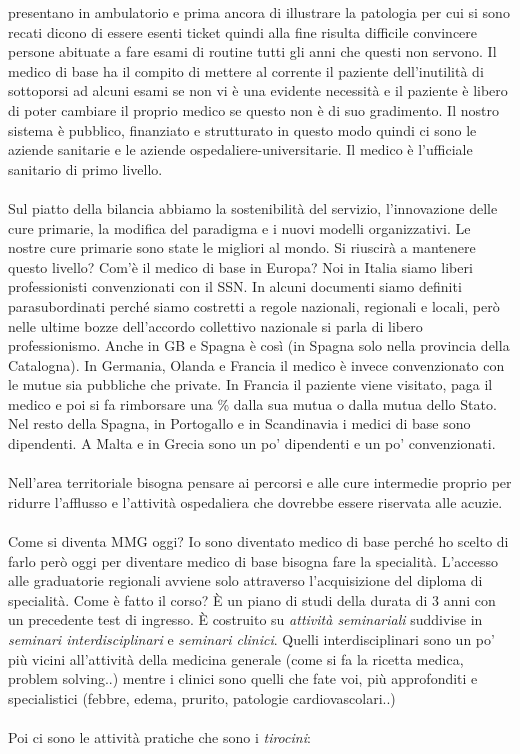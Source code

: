 presentano in ambulatorio e prima ancora di illustrare la patologia per
cui si sono recati dicono di essere esenti ticket quindi alla fine
risulta difficile convincere persone abituate a fare esami di routine
tutti gli anni che questi non servono. Il medico di base ha il compito
di mettere al corrente il paziente dell'inutilità di sottoporsi ad
alcuni esami se non vi è una evidente necessità e il paziente è libero
di poter cambiare il proprio medico se questo non è di suo gradimento.
Il nostro sistema è pubblico, finanziato e strutturato in questo modo
quindi ci sono le aziende sanitarie e le aziende
ospedaliere-universitarie. Il medico è l'ufficiale sanitario di primo
livello.
\\\\
Sul piatto della bilancia abbiamo la sostenibilità del servizio,
l'innovazione delle cure primarie, la modifica del paradigma e i nuovi
modelli organizzativi. Le nostre cure primarie sono state le migliori al
mondo. Si riuscirà a mantenere questo livello? Com'è il medico di base
in Europa? Noi in Italia siamo liberi professionisti convenzionati con
il SSN. In alcuni documenti siamo definiti parasubordinati perché siamo
costretti a regole nazionali, regionali e locali, però nelle ultime
bozze dell'accordo collettivo nazionale si parla di libero
professionismo. Anche in GB e Spagna è così (in Spagna solo nella
provincia della Catalogna). In Germania, Olanda e Francia il medico è
invece convenzionato con le mutue sia pubbliche che private. In Francia
il paziente viene visitato, paga il medico e poi si fa rimborsare una \%
dalla sua mutua o dalla mutua dello Stato. Nel resto della Spagna, in
Portogallo e in Scandinavia i medici di base sono dipendenti. A Malta e
in Grecia sono un po' dipendenti e un po' convenzionati.
\\\\
Nell'area territoriale bisogna pensare ai percorsi e alle cure
intermedie proprio per ridurre l'afflusso e l'attività ospedaliera che
dovrebbe essere riservata alle acuzie.
\\\\
Come si diventa MMG oggi? Io sono diventato medico di base perché ho
scelto di farlo però oggi per diventare medico di base bisogna fare la
specialità. L'accesso alle graduatorie regionali avviene solo attraverso
l'acquisizione del diploma di specialità. Come è fatto il corso? È un
piano di studi della durata di 3 anni con un precedente test di
ingresso. È costruito su \emph{attività seminariali} suddivise in
\emph{seminari interdisciplinari} e \emph{seminari clinici}. Quelli
interdisciplinari sono un po' più vicini all'attività della medicina
generale (come si fa la ricetta medica, problem solving..) mentre i
clinici sono quelli che fate voi, più approfonditi e specialistici
(febbre, edema, prurito, patologie cardiovascolari..)
\\\\
Poi ci sono le attività pratiche che sono i \emph{tirocini}:

